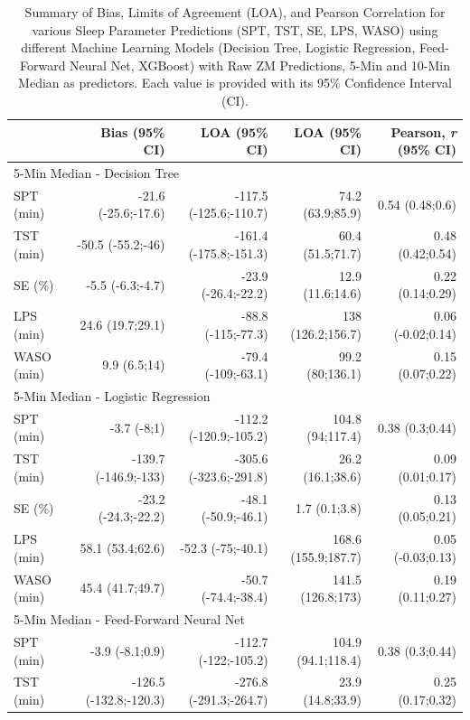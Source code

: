 \documentclass[
  super,
  preprint,
  3p]{elsarticle}
\begin{document}
\hypertarget{tbl-ba_cor}{}
\begin{longtable}{lrrrr}
\caption{\label{tbl-ba_cor}Summary of Bias, Limits of Agreement (LOA), and Pearson Correlation for
various Sleep Parameter Predictions (SPT, TST, SE, LPS, WASO) using
different Machine Learning Models (Decision Tree, Logistic Regression,
Feed-Forward Neural Net, XGBoost) with Raw ZM Predictions, 5-Min and
10-Min Median as predictors. Each value is provided with its 95\%
Confidence Interval (CI). }\tabularnewline

\toprule
 & Bias (95\% CI) & LOA (95\% CI) & LOA (95\% CI) & Pearson, \emph{r} (95\% CI) \\ 
\midrule
\multicolumn{5}{l}{5-Min Median - Decision Tree} \\ 
\midrule
SPT (min) & -21.6 (-25.6;-17.6) & -117.5 (-125.6;-110.7) & 74.2 (63.9;85.9) & 0.54 (0.48;0.6) \\ 
TST (min) & -50.5 (-55.2;-46) & -161.4 (-175.8;-151.3) & 60.4 (51.5;71.7) & 0.48 (0.42;0.54) \\ 
SE (\%) & -5.5 (-6.3;-4.7) & -23.9 (-26.4;-22.2) & 12.9 (11.6;14.6) & 0.22 (0.14;0.29) \\ 
LPS (min) & 24.6 (19.7;29.1) & -88.8 (-115;-77.3) & 138 (126.2;156.7) & 0.06 (-0.02;0.14) \\ 
WASO (min) & 9.9 (6.5;14) & -79.4 (-109;-63.1) & 99.2 (80;136.1) & 0.15 (0.07;0.22) \\ 
\midrule
\multicolumn{5}{l}{5-Min Median - Logistic Regression} \\ 
\midrule
SPT (min) & -3.7 (-8;1) & -112.2 (-120.9;-105.2) & 104.8 (94;117.4) & 0.38 (0.3;0.44) \\ 
TST (min) & -139.7 (-146.9;-133) & -305.6 (-323.6;-291.8) & 26.2 (16.1;38.6) & 0.09 (0.01;0.17) \\ 
SE (\%) & -23.2 (-24.3;-22.2) & -48.1 (-50.9;-46.1) & 1.7 (0.1;3.8) & 0.13 (0.05;0.21) \\ 
LPS (min) & 58.1 (53.4;62.6) & -52.3 (-75;-40.1) & 168.6 (155.9;187.7) & 0.05 (-0.03;0.13) \\ 
WASO (min) & 45.4 (41.7;49.7) & -50.7 (-74.4;-38.4) & 141.5 (126.8;173) & 0.19 (0.11;0.27) \\ 
\midrule
\multicolumn{5}{l}{5-Min Median - Feed-Forward Neural Net} \\ 
\midrule
SPT (min) & -3.9 (-8.1;0.9) & -112.7 (-122;-105.2) & 104.9 (94.1;118.4) & 0.38 (0.3;0.44) \\ 
TST (min) & -126.5 (-132.8;-120.3) & -276.8 (-291.3;-264.7) & 23.9 (14.8;33.9) & 0.25 (0.17;0.32) \\ 

\end{longtable}
\end{document}
